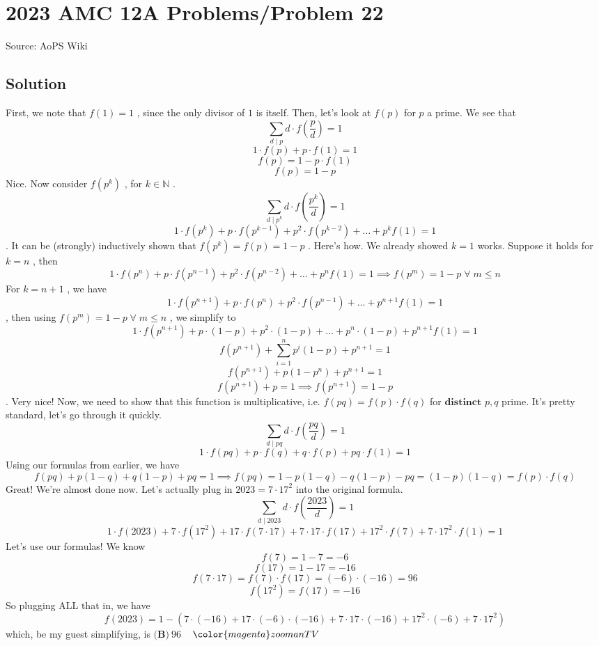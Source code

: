 \documentclass[12pt]{article}
\begin{document}
\section*{{2023 AMC 12A Problems/Problem 22}}
Source: AoPS Wiki

\subsection*{Solution}
First, we note that $f(1) = 1$ , since the only divisor of $1$ is itself. Then, let's look at $f(p)$ for $p$ a prime. We see that \[\sum_{d \mid p} d \cdot f\left(\frac{p}{d}\right) = 1\] \[1 \cdot f(p) + p \cdot f(1) = 1\] \[f(p) = 1 - p \cdot f(1)\] \[f(p) = 1-p\] Nice. Now consider $f(p^k)$ , for $k \in \mathbb{N}$ . \[\sum_{d \mid p^k} d \cdot f\left(\frac{p^k}{d}\right) = 1\] \[1 \cdot f(p^k) + p \cdot f(p^{k-1}) + p^2 \cdot f(p^{k-2}) + \dotsc + p^k f(1) = 1\] . It can be (strongly) inductively shown that $f(p^k) = f(p) = 1-p$ . Here's how. We already showed $k=1$ works. Suppose it holds for $k = n$ , then \[1 \cdot f(p^n) + p \cdot f(p^{n-1}) + p^2 \cdot f(p^{n-2}) + \dotsc + p^n f(1) = 1 \implies f(p^m) = 1-p \; \forall \; m \leqslant n\] For $k = n+1$ , we have \[1 \cdot f(p^{n+1}) + p \cdot f(p^{n}) + p^2 \cdot f(p^{n-1}) + \dotsc + p^{n+1} f(1) = 1\] , then using $f(p^m) = 1-p \; \forall \; m \leqslant n$ , we simplify to \[1 \cdot f(p^{n+1}) + p \cdot (1-p) + p^2 \cdot (1-p) + \dotsc + p^n \cdot (1-p) + p^{n+1} f(1) = 1\] \[f(p^{n+1}) + \sum_{i=1}^n p^i (1-p) + p^{n+1} = 1\] \[f(p^{n+1}) + p(1 - p^n) + p^{n+1} = 1\] \[f(p^{n+1}) + p = 1 \implies f(p^{n+1}) = 1-p\] . Very nice! Now, we need to show that this function is multiplicative, i.e. $f(pq) = f(p) \cdot f(q)$ for $\textbf{distinct}$ $p,q$ prime.
It's pretty standard, let's go through it quickly. \[\sum_{d \mid pq} d \cdot f\left(\frac{pq}{d}\right) = 1\] \[1 \cdot f(pq) + p \cdot f(q) + q \cdot f(p) + pq \cdot f(1) = 1\] Using our formulas from earlier, we have \[f(pq) + p(1-q) + q(1-p) + pq = 1 \implies f(pq) = 1 - p(1-q) - q(1-p) - pq = (1-p)(1-q) = f(p) \cdot f(q)\] Great! We're almost done now.
Let's actually plug in $2023 = 7 \cdot 17^2$ into the original formula. \[\sum_{d \mid 2023} d \cdot f\left(\frac{2023}{d}\right) = 1\] \[1 \cdot f(2023) + 7 \cdot f(17^2) + 17 \cdot f(7 \cdot 17) + 7 \cdot 17 \cdot f(17) + 17^2 \cdot f(7) + 7 \cdot 17^2 \cdot f(1) = 1\] Let's use our formulas! We know \[f(7) = 1-7 = -6\] \[f(17) = 1-17 = -16\] \[f(7 \cdot 17) = f(7) \cdot f(17) = (-6) \cdot (-16) = 96\] \[f(17^2) = f(17) = -16\] So plugging ALL that in, we have \[f(2023) = 1 - \left(7 \cdot (-16) + 17 \cdot (-6) \cdot (-16) + 7 \cdot 17 \cdot (-16) + 17^2 \cdot (-6) + 7 \cdot 17^2\right)\] which, be my guest simplifying, is $\boxed{\textbf{(B)} \ 96}$ ~ $\color{magenta} zoomanTV$
\end{document}
